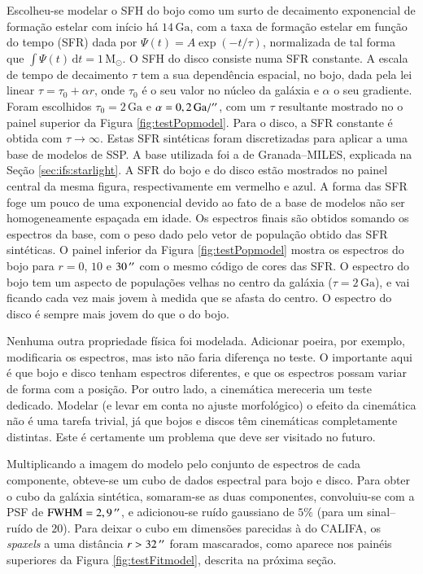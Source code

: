Escolheu-se modelar o SFH do bojo como um surto de decaimento exponencial de
formação estelar com início há $14\,\mathrm{Ga}$, com a taxa de formação estelar
em função do tempo (SFR) dada por $\Psi(t) = A \exp (-t/\tau)$, normalizada de
tal forma que $\int \Psi(t)\,\mathrm{d}t = 1\,\mathrm{M}_\odot$. O SFH do disco
consiste numa SFR constante. A escala de tempo de decaimento $\tau$ tem a sua
dependência espacial, no bojo, dada pela lei linear $\tau = \tau_0 + \alpha r$,
onde $\tau_0$ é o seu valor no núcleo da galáxia e $\alpha$ o seu gradiente.
Foram escolhidos $\tau_0 = 2\,\mathrm{Ga}$ e $\alpha = 0,2\,\mathrm{Ga} /
^{\prime\prime}$, com um $\tau$ resultante mostrado no o painel superior da Figura
\ref{fig:testPopmodel}. Para o disco, a SFR constante é obtida com
$\tau\to\infty$. Estas SFR sintéticas foram discretizadas para aplicar a uma
base de modelos de SSP. A base utilizada foi a de Granada--MILES, explicada na
Seção \ref{sec:ifs:starlight}. A SFR do bojo e do disco estão mostrados no
painel central da mesma figura, respectivamente em vermelho e azul. A forma das
SFR foge um pouco de uma exponencial devido ao fato de a base de modelos não ser
homogeneamente espaçada em idade. Os espectros finais são obtidos somando os
espectros da base, com o peso dado pelo vetor de população obtido das SFR
sintéticas. O painel inferior da Figura \ref{fig:testPopmodel} mostra os
espectros do bojo para $r = 0$, $10$ e $30\,^{\prime\prime}$ com o mesmo código de cores
das SFR. O espectro do bojo tem um aspecto de populações velhas no centro da
galáxia ($\tau = 2\,\mathrm{Ga}$), e vai ficando cada vez mais jovem à medida
que se afasta do centro. O espectro do disco é sempre mais jovem do que o do
bojo.

Nenhuma outra propriedade física foi modelada. Adicionar poeira, por exemplo,
modificaria os espectros, mas isto não faria diferença no teste. O importante
aqui é que bojo e disco tenham espectros diferentes, e que os espectros possam
variar de forma com a posição. Por outro lado, a cinemática mereceria um teste
dedicado. Modelar (e levar em conta no ajuste morfológico) o efeito da
cinemática não é uma tarefa trivial, já que bojos e discos têm cinemáticas
completamente distintas. Este é certamente um problema que deve ser visitado no
futuro.


Multiplicando a imagem do modelo pelo conjunto de espectros de cada componente,
obteve-se um cubo de dados espectral para bojo e disco. Para obter o cubo da
galáxia sintética, somaram-se as duas componentes, convoluiu-se com a PSF de
$\mathrm{FWHM} = 2,9\,^{\prime\prime}$, e adicionou-se ruído gaussiano de $5\%$ (para um
sinal--ruído de $20$). Para deixar o cubo em dimensões parecidas à do CALIFA, os
{\em spaxels} a uma distância $r > 32\,^{\prime\prime}$ foram mascarados, como aparece nos
painéis superiores da Figura \ref{fig:testFitmodel}, descrita na próxima seção.

